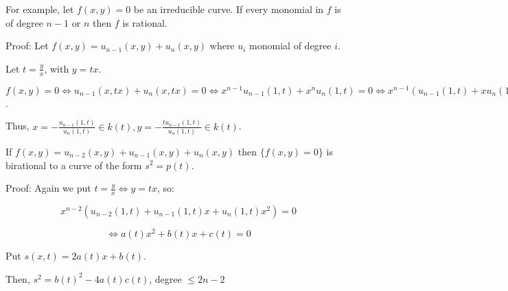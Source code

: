 \documentclass{article}
\theoremstyle{definition}
\begin{document}
        For example, let \(f(x,y)=0\) be an irreducible curve. If every monomial in \(f\) is of degree \(n-1\) or \(n\) then \(f\) is rational.

        Proof: Let \(f(x,y) = u_{n-1} (x,y) + u_n(x,y)\) where \(u_i\) monomial of degree \(i\).

        Let \(t = \frac{y}{x}\), with \(y = tx\).
        
        \(f(x,y)=0 \iff u_{n-1}(x,tx) + u_n(x,tx) = 0 \iff x^{n-1} u_{n-1} (1,t) + x^n u_n(1,t) = 0 \iff x^{n-1} (u_{n-1}(1,t)+xu_n(1,t)) =  0\).
        
        Thus, \(x = - \frac{u_{n-1}(1,t)}{u_n(1,t)}\in k(t), y = - \frac{t u_{n-1} (1,t)}{u_n(1,t)} \in k(t)\).

        If \(f(x,y) = u_{n-2} (x,y) + u_{n-1} (x,y) + u_n(x,y)\) then \(\{ f(x,y)=0 \} \) is birational to a curve of the form \(s^2 = p(t)\).

        Proof: Again we put \(t = \frac{y}{x} \iff y=tx\), so:

        \[
            x^{n-2} (u_{n-2}(1,t) + u_{n-1} (1,t) x + u_n(1,t) x^2) = 0
        \]

        \[
            \iff a(t)x^2 + b(t)x + c(t) = 0
        \]

        Put \(s(x,t) = 2a(t)x + b(t)\).

        Then, \(s^2 = b(t)^2 - 4a(t)c(t)\), degree \(\leq 2n-2\) 
\end{document}
